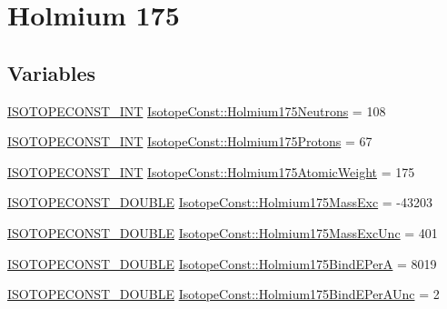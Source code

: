 \hypertarget{group___isotope_const-_holmium-_ho175}{}\section{Holmium 175}
\label{group___isotope_const-_holmium-_ho175}
\subsection*{Variables}
\begin{DoxyCompactItemize}
\item 
\mbox{\hyperlink{group___isotope_const-_macros_ga5f18360b3e99483a35c32d789e62621c}{I\+S\+O\+T\+O\+P\+E\+C\+O\+N\+S\+T\+\_\+\+I\+NT}} \mbox{\hyperlink{group___isotope_const-_holmium-_ho175_gafe5a07799a3230604c9c6e68381a1cd6}{Isotope\+Const\+::\+Holmium175\+Neutrons}} = 108
\item 
\mbox{\hyperlink{group___isotope_const-_macros_ga5f18360b3e99483a35c32d789e62621c}{I\+S\+O\+T\+O\+P\+E\+C\+O\+N\+S\+T\+\_\+\+I\+NT}} \mbox{\hyperlink{group___isotope_const-_holmium-_ho175_gae7610e2ecb02768ef368c4894101108d}{Isotope\+Const\+::\+Holmium175\+Protons}} = 67
\item 
\mbox{\hyperlink{group___isotope_const-_macros_ga5f18360b3e99483a35c32d789e62621c}{I\+S\+O\+T\+O\+P\+E\+C\+O\+N\+S\+T\+\_\+\+I\+NT}} \mbox{\hyperlink{group___isotope_const-_holmium-_ho175_ga5eb11cdf910eda1f6d2ae6e654d0ce65}{Isotope\+Const\+::\+Holmium175\+Atomic\+Weight}} = 175
\item 
\mbox{\hyperlink{group___isotope_const-_macros_ga8f45a7272ce02c0b4c65c44636ed719a}{I\+S\+O\+T\+O\+P\+E\+C\+O\+N\+S\+T\+\_\+\+D\+O\+U\+B\+LE}} \mbox{\hyperlink{group___isotope_const-_holmium-_ho175_ga9b13167da30bcb86754508f602469e87}{Isotope\+Const\+::\+Holmium175\+Mass\+Exc}} = -\/43203
\item 
\mbox{\hyperlink{group___isotope_const-_macros_ga8f45a7272ce02c0b4c65c44636ed719a}{I\+S\+O\+T\+O\+P\+E\+C\+O\+N\+S\+T\+\_\+\+D\+O\+U\+B\+LE}} \mbox{\hyperlink{group___isotope_const-_holmium-_ho175_gafa0ea4c9fba2871e163642528dc8b097}{Isotope\+Const\+::\+Holmium175\+Mass\+Exc\+Unc}} = 401
\item 
\mbox{\hyperlink{group___isotope_const-_macros_ga8f45a7272ce02c0b4c65c44636ed719a}{I\+S\+O\+T\+O\+P\+E\+C\+O\+N\+S\+T\+\_\+\+D\+O\+U\+B\+LE}} \mbox{\hyperlink{group___isotope_const-_holmium-_ho175_ga4ae32e58d38cd09c4a4c03893e56489c}{Isotope\+Const\+::\+Holmium175\+Bind\+E\+PerA}} = 8019
\item 
\mbox{\hyperlink{group___isotope_const-_macros_ga8f45a7272ce02c0b4c65c44636ed719a}{I\+S\+O\+T\+O\+P\+E\+C\+O\+N\+S\+T\+\_\+\+D\+O\+U\+B\+LE}} \mbox{\hyperlink{group___isotope_const-_holmium-_ho175_ga89f0b0f160c57ba49ca1b92445a351fd}{Isotope\+Const\+::\+Holmium175\+Bind\+E\+Per\+A\+Unc}} = 2

\end{DoxyCompactItemize}
